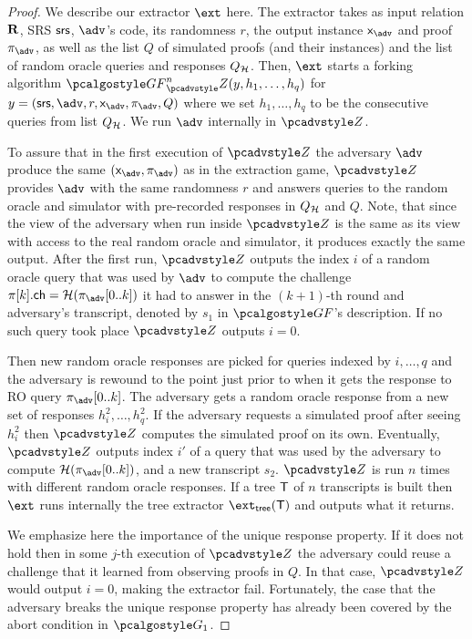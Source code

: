 \documentclass[runningheads,11pt]{llncs}
\begin{document}
\begin{proof}
We describe our extractor $\ext$ here. The extractor takes as input relation
$\mathbf{R}$, SRS $\mathsf{srs}$, $\advse$'s code, its randomness $r$, the output instance
$\inp_{\advse}$ and proof $\zkproof_{\advse}$, as well as the list $Q$ of
simulated proofs (and their instances) and the list of random oracle queries and
responses $Q_{\mathcal{H}}$. Then, $\ext$ starts a forking algorithm
$\genforking^{n}_\zdv(y,h_1, \ldots, h_q)$ for
$y = (\srs, \advse, r, \inp_{\advse}, \zkproof_{\advse}, Q)$ where we set
$h_1, \ldots, h_q$ to be the consecutive queries from list $Q_{\mathcal{H}}$. We run
$\advse$ internally in $\zdv$.%

To assure that in the first execution of $\zdv$ the adversary $\advse$ produce
the same $(\inp_{\advse}, \zkproof_{\advse})$ as in the extraction game, $\zdv$
provides $\advse$ with the same randomness $r$ and answers queries to the random
oracle and simulator with pre-recorded responses in $Q_{\mathcal{H}}$ and $Q$.
%
Note, that since the view of the adversary when run inside $\zdv$ is the same as its
view with access to the real random oracle and simulator, it produces exactly the
same output. After the first run, $\zdv$ outputs the index $i$ of a random oracle
query that was used by $\advse$ to compute the challenge $\zkproof[k].\ch =
\ro(\zkproof_{\advse}[0..k])$ it had to answer in the $(k + 1)$-th round and
adversary's transcript, denoted by $s_1$ in $\genforking$'s description. If no
such query took place $\zdv$ outputs $i = 0$.

Then new random oracle responses are picked for queries indexed by
$i, \ldots, q$ and the adversary is rewound to the point just prior to when it gets the
response to RO query $\zkproof_{\advse}[0..k]$. The adversary gets a random
oracle response from a new set of responses $h^2_i, \ldots, h^2_q$. If the
adversary requests a simulated proof after seeing $h^2_i$ then $\zdv$ computes
the simulated proof on its own. Eventually, $\zdv$ outputs index $i'$ of a query
that was used by the adversary to compute $\ro(\zkproof_{\advse}[0..k])$, and a
new transcript $s_2$. $\zdv$ is run $n$ times with different random oracle
responses. If a tree $\mathsf{T}$ of $n$ transcripts is built then $\ext$
runs internally the tree extractor $\extt(\tree)$ and outputs what it returns.

We emphasize here the importance of the unique response property. If it does not
hold then in some $j$-th execution of $\zdv$ the adversary could reuse a
challenge that it learned from observing proofs in $Q$. In that case, $\zdv$
would output $i = 0$, making the extractor fail. Fortunately, the case that the
adversary breaks the unique response property has already been covered by the
abort condition in $\game{1}$.


\end{proof}
\end{document}
